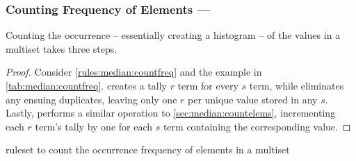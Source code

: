 \subsubsection{Counting Frequency of Elements --- }\label{sec:median:countfreq}

\begin{proposition}\label{prop:median:countfreq}
Counting the occurrence -- essentially creating a histogram -- of the values in a multiset takes three steps.
\end{proposition}

\begin{proof}
Consider \cref{rules:median:countfreq} and the example in \cref{tab:median:countfreq}.   creates a tally \(r\) term for every \(s\) term, while  eliminates any ensuing duplicates, leaving only one \(r\) per unique value stored in any \(s\).  Lastly,  performs a similar operation to \cref{sec:median:countelems}, incrementing each \(r\) term's tally by one for each \(s\) term containing the corresponding value.
\end{proof}

\begin{cprulesetfloat}
\begin{cpruleset}


\end{cpruleset}
\caption{\label{rules:median:countfreq}\Gls{ruleset} to count the occurrence frequency of elements in a multiset}
\end{cprulesetfloat}

